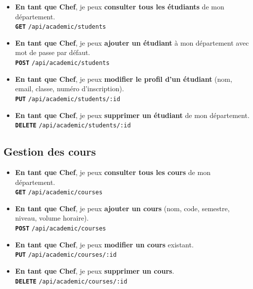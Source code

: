 \documentclass[12pt,a4paper]{article}
\newcommand{\route}[1]{\texorpdfstring{\texttt{\small\color{routeGray}#1}}{#1}}
\newcommand{\httpmethod}[1]{%
  \ifstrequal{#1}{GET}{\colorbox{blue!15}{\texttt{\bfseries\color{blue!70!black}GET}}}{}%
  \ifstrequal{#1}{POST}{\colorbox{green!18}{\texttt{\bfseries\color{green!60!black}POST}}}{}%
  \ifstrequal{#1}{PUT}{\colorbox{orange!18}{\texttt{\bfseries\color{orange!70!black}PUT}}}{}%
  \ifstrequal{#1}{DELETE}{\colorbox{red!15}{\texttt{\bfseries\color{red!70!black}DELETE}}}{}%
}
\newcommand{\usmark}{\color{accentGold}$\blacktriangleright$\;}
\begin{document}
\begin{chefbox}
\begin{itemize}[leftmargin=1.2cm, labelsep=0.4cm]
  \item[\usmark] \textbf{En tant que Chef}, je peux \textbf{consulter tous les étudiants} de mon département.\\
    \httpmethod{GET} \route{/api/academic/students}

  \item[\usmark] \textbf{En tant que Chef}, je peux \textbf{ajouter un étudiant} à mon département avec mot de passe par défaut.\\
    \httpmethod{POST} \route{/api/academic/students}

  \item[\usmark] \textbf{En tant que Chef}, je peux \textbf{modifier le profil d'un étudiant} (nom, email, classe, numéro d'inscription).\\
    \httpmethod{PUT} \route{/api/academic/students/:id}

  \item[\usmark] \textbf{En tant que Chef}, je peux \textbf{supprimer un étudiant} de mon département.\\
    \httpmethod{DELETE} \route{/api/academic/students/:id}
\end{itemize}

\subsection*{Gestion des cours}

\begin{itemize}[leftmargin=1.2cm, labelsep=0.4cm]
  \item[\usmark] \textbf{En tant que Chef}, je peux \textbf{consulter tous les cours} de mon département.\\
    \httpmethod{GET} \route{/api/academic/courses}

  \item[\usmark] \textbf{En tant que Chef}, je peux \textbf{ajouter un cours} (nom, code, semestre, niveau, volume horaire).\\
    \httpmethod{POST} \route{/api/academic/courses}

  \item[\usmark] \textbf{En tant que Chef}, je peux \textbf{modifier un cours} existant.\\
    \httpmethod{PUT} \route{/api/academic/courses/:id}

  \item[\usmark] \textbf{En tant que Chef}, je peux \textbf{supprimer un cours}.\\
    \httpmethod{DELETE} \route{/api/academic/courses/:id}
\end{itemize}


\end{chefbox}
\end{document}
